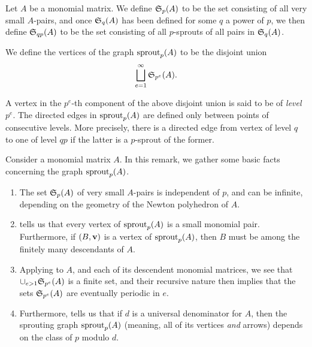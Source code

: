 \documentclass[11pt]{amsart}
\newcommand{\denom}{d}
\begin{document}
\begin{definition}  Let $A$ be a monomial matrix.  We define $\mathfrak{S}_p(A)$ to be the set consisting of all very small $A$-pairs, and once $\mathfrak{S}_q(A)$ has been defined for some $q$ a power of $p$,  we then define $\mathfrak{S}_{qp}(A)$ to be the set consisting of all $p$-sprouts of all pairs in $\mathfrak{S}_q(A)$.  

We define the vertices of the graph $\operatorname{sprout}_p(A)$ to be the disjoint union \[ \bigsqcup_{e=1}^{\infty} \mathfrak{S}_{p^e}(A). \]
 
A vertex in the $p^e$-th component of the above disjoint union is said to be of \emph{level} $p^e$.  The directed edges in $\operatorname{sprout}_p(A)$ are defined only between points of consecutive levels.  More precisely, there is a directed edge from vertex of level $q$ to one of level $qp$ if the latter is a $p$-sprout of the former.
\end{definition}


\begin{remark}
\label{elementary1: R}
Consider a monomial matrix $A$.  In this remark, we gather some basic facts concerning the graph $\operatorname{sprout}_p(A)$.
\begin{enumerate} 
\item The set $\mathfrak{S}_p(A)$ of very small $A$-pairs is independent of $p$, and can be infinite, depending on the geometry of the Newton polyhedron of $A$.  

\item \label{elementary1 small pairs}  tells us that every vertex of $\operatorname{sprout}_p(A)$ is a small monomial pair.  Furthermore, if $(B,\mathbf{v})$ is a vertex of $\operatorname{sprout}_p(A)$, then $B$ must be among the finitely many descendants of $A$.

\item \label{elementary1 periodic in e} Applying  to $A$, and each of its descendent monomial matrices, we see that $\cup_{e>1} \mathfrak{S}_{p^e}(A)$ is a finite set, and their recursive nature then implies that the sets $\mathfrak{S}_{p^e}(A)$ are eventually periodic in $e$.  

\item \label{elementary1 periodic in p} Furthermore,  tells us that if $\denom$ is a universal denominator for $A$, then the sprouting graph  $\operatorname{sprout}_p(A)$ (meaning, all of its vertices \emph{and} arrows) depends on the class of $p$ modulo $\denom$.

\end{enumerate}
\end{remark}
\end{document}
